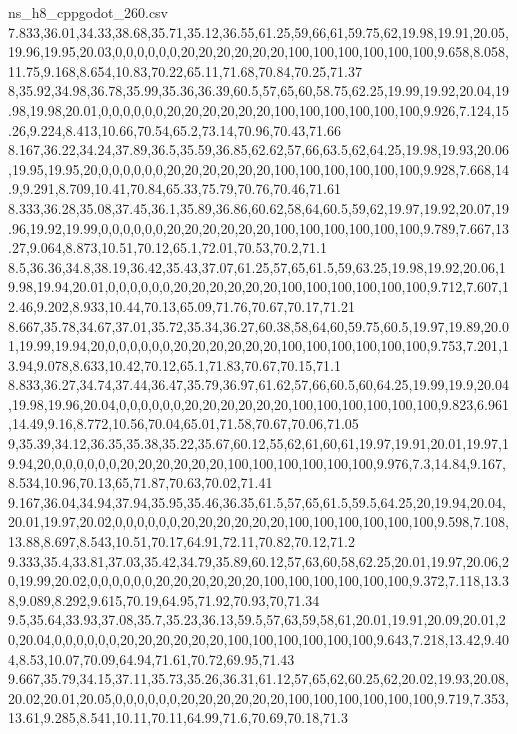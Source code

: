 \begin{filecontents*}[overwrite]{ns_h8_cppgodot_260.csv}
7.833,36.01,34.33,38.68,35.71,35.12,36.55,61.25,59,66,61,59.75,62,19.98,19.91,20.05,19.96,19.95,20.03,0,0,0,0,0,0,20,20,20,20,20,20,100,100,100,100,100,100,9.658,8.058,11.75,9.168,8.654,10.83,70.22,65.11,71.68,70.84,70.25,71.37
8,35.92,34.98,36.78,35.99,35.36,36.39,60.5,57,65,60,58.75,62.25,19.99,19.92,20.04,19.98,19.98,20.01,0,0,0,0,0,0,20,20,20,20,20,20,100,100,100,100,100,100,9.926,7.124,15.26,9.224,8.413,10.66,70.54,65.2,73.14,70.96,70.43,71.66
8.167,36.22,34.24,37.89,36.5,35.59,36.85,62.62,57,66,63.5,62,64.25,19.98,19.93,20.06,19.95,19.95,20,0,0,0,0,0,0,20,20,20,20,20,20,100,100,100,100,100,100,9.928,7.668,14.9,9.291,8.709,10.41,70.84,65.33,75.79,70.76,70.46,71.61
8.333,36.28,35.08,37.45,36.1,35.89,36.86,60.62,58,64,60.5,59,62,19.97,19.92,20.07,19.96,19.92,19.99,0,0,0,0,0,0,20,20,20,20,20,20,100,100,100,100,100,100,9.789,7.667,13.27,9.064,8.873,10.51,70.12,65.1,72.01,70.53,70.2,71.1
8.5,36.36,34.8,38.19,36.42,35.43,37.07,61.25,57,65,61.5,59,63.25,19.98,19.92,20.06,19.98,19.94,20.01,0,0,0,0,0,0,20,20,20,20,20,20,100,100,100,100,100,100,9.712,7.607,12.46,9.202,8.933,10.44,70.13,65.09,71.76,70.67,70.17,71.21
8.667,35.78,34.67,37.01,35.72,35.34,36.27,60.38,58,64,60,59.75,60.5,19.97,19.89,20.01,19.99,19.94,20,0,0,0,0,0,0,20,20,20,20,20,20,100,100,100,100,100,100,9.753,7.201,13.94,9.078,8.633,10.42,70.12,65.1,71.83,70.67,70.15,71.1
8.833,36.27,34.74,37.44,36.47,35.79,36.97,61.62,57,66,60.5,60,64.25,19.99,19.9,20.04,19.98,19.96,20.04,0,0,0,0,0,0,20,20,20,20,20,20,100,100,100,100,100,100,9.823,6.961,14.49,9.16,8.772,10.56,70.04,65.01,71.58,70.67,70.06,71.05
9,35.39,34.12,36.35,35.38,35.22,35.67,60.12,55,62,61,60,61,19.97,19.91,20.01,19.97,19.94,20,0,0,0,0,0,0,20,20,20,20,20,20,100,100,100,100,100,100,9.976,7.3,14.84,9.167,8.534,10.96,70.13,65,71.87,70.63,70.02,71.41
9.167,36.04,34.94,37.94,35.95,35.46,36.35,61.5,57,65,61.5,59.5,64.25,20,19.94,20.04,20.01,19.97,20.02,0,0,0,0,0,0,20,20,20,20,20,20,100,100,100,100,100,100,9.598,7.108,13.88,8.697,8.543,10.51,70.17,64.91,72.11,70.82,70.12,71.2
9.333,35.4,33.81,37.03,35.42,34.79,35.89,60.12,57,63,60,58,62.25,20.01,19.97,20.06,20,19.99,20.02,0,0,0,0,0,0,20,20,20,20,20,20,100,100,100,100,100,100,9.372,7.118,13.38,9.089,8.292,9.615,70.19,64.95,71.92,70.93,70,71.34
9.5,35.64,33.93,37.08,35.7,35.23,36.13,59.5,57,63,59,58,61,20.01,19.91,20.09,20.01,20,20.04,0,0,0,0,0,0,20,20,20,20,20,20,100,100,100,100,100,100,9.643,7.218,13.42,9.404,8.53,10.07,70.09,64.94,71.61,70.72,69.95,71.43
9.667,35.79,34.15,37.11,35.73,35.26,36.31,61.12,57,65,62,60.25,62,20.02,19.93,20.08,20.02,20.01,20.05,0,0,0,0,0,0,20,20,20,20,20,20,100,100,100,100,100,100,9.719,7.353,13.61,9.285,8.541,10.11,70.11,64.99,71.6,70.69,70.18,71.3

\end{filecontents*}

